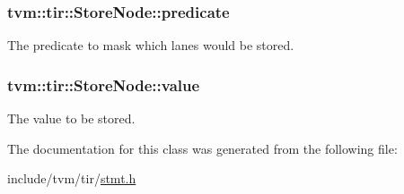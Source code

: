 \subsubsection[{\texorpdfstring{predicate}{predicate}}]{ tvm\+::tir\+::\+Store\+Node\+::predicate}\hypertarget{classtvm_1_1tir_1_1StoreNode_a1f4b2a87017d5c8ff41f79701d91f99a}{}\label{classtvm_1_1tir_1_1StoreNode_a1f4b2a87017d5c8ff41f79701d91f99a}


The predicate to mask which lanes would be stored. 

\subsubsection[{\texorpdfstring{value}{value}}]{ tvm\+::tir\+::\+Store\+Node\+::value}\hypertarget{classtvm_1_1tir_1_1StoreNode_ab263339a5ca3f30c5be6498f3db67bc0}{}\label{classtvm_1_1tir_1_1StoreNode_ab263339a5ca3f30c5be6498f3db67bc0}


The value to be stored. 



The documentation for this class was generated from the following file\+:\begin{DoxyCompactItemize}
\item 
include/tvm/tir/\hyperlink{stmt_8h}{stmt.\+h}\end{DoxyCompactItemize}
